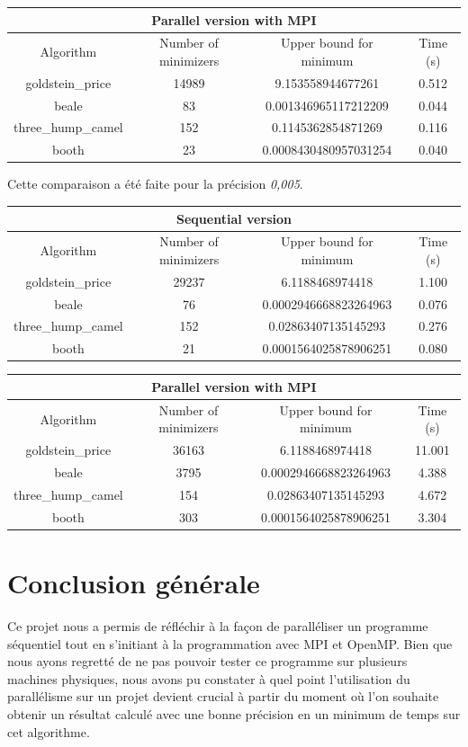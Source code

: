 \documentclass[a4paper,10pt]{article}
\begin{document}
\begin{tabular}{|c|c|c|c|}
\hline
\multicolumn{4}{|c|}{Parallel version with MPI}\\
\hline
Algorithm & Number of minimizers & Upper bound for minimum & Time (s) \\
\hline
goldstein\_price & 14989 & 9.153558944677261 & 0.512\\
\hline
beale & 83 & 0.001346965117212209 & 0.044\\
\hline
three\_hump\_camel & 152 & 0.1145362854871269 & 0.116\\
\hline
booth & 23 & 0.0008430480957031254 & 0.040\\
\hline
\end{tabular}

Cette comparaison a été faite pour la précision \emph{0,005}.

\begin{tabular}{|c|c|c|c|}
\hline
\multicolumn{4}{|c|}{Sequential version}\\
\hline
Algorithm & Number of minimizers & Upper bound for minimum & Time (s) \\
\hline
goldstein\_price & 29237 & 6.1188468974418 & 1.100\\
\hline
beale & 76 & 0.0002946668823264963 & 0.076\\
\hline
three\_hump\_camel & 152 & 0.02863407135145293 & 0.276\\
\hline
booth & 21 & 0.0001564025878906251 & 0.080\\
\hline
\end{tabular}

\begin{tabular}{|c|c|c|c|}
\hline
\multicolumn{4}{|c|}{Parallel version with MPI}\\
\hline
Algorithm & Number of minimizers & Upper bound for minimum & Time (s) \\
\hline
goldstein\_price & 36163 & 6.1188468974418 & 11.001\\
\hline
beale & 3795 & 0.0002946668823264963 & 4.388\\
\hline
three\_hump\_camel & 154 & 0.02863407135145293 & 4.672\\
\hline
booth & 303 & 0.0001564025878906251 & 3.304\\
\hline
\end{tabular}


\newpage
\section{Conclusion générale}
Ce projet nous a permis de réfléchir à la façon de paralléliser un programme séquentiel tout en s'initiant à la programmation avec MPI et OpenMP. 
Bien que nous ayons regretté de ne pas pouvoir tester ce programme 
sur plusieurs machines physiques, nous avons pu constater 
à quel point l'utilisation du parallélisme sur un projet 
devient crucial à partir du moment où l'on souhaite obtenir un résultat calculé
avec une bonne précision en un minimum de temps sur cet algorithme. 
\end{document}
